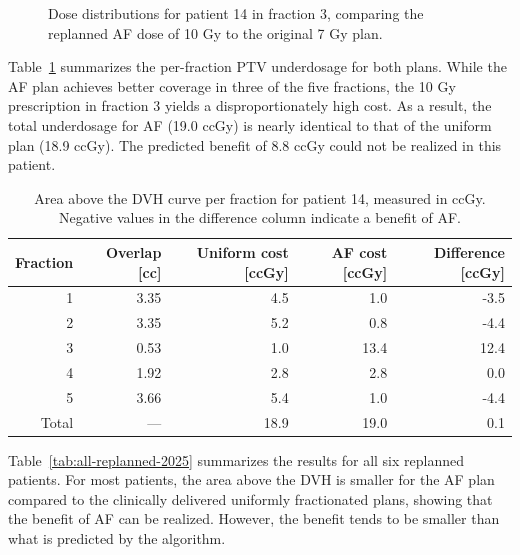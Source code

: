 \documentclass[11pt]{article}
\newcommand{\toprule}{\hline}
\newcommand{\midrule}{\hline}
\newcommand{\bottomrule}{\hline}
\begin{document}
\begin{figure}[ht]
\centering
{}
\caption{Dose distributions for patient 14 in fraction 3, comparing the replanned AF dose of 10 Gy to the original 7 Gy plan.}
\label{fig:patient14-dose-dist}
\end{figure}

Table~\ref{tab:patient14-replan} summarizes the per-fraction PTV underdosage for both plans. While the AF plan achieves better coverage in three of the five fractions, the 10 Gy prescription in fraction 3 yields a disproportionately high cost. As a result, the total underdosage for AF (19.0 ccGy) is nearly identical to that of the uniform plan (18.9 ccGy). The predicted benefit of 8.8 ccGy could not be realized in this patient.

\begin{table}[ht]
\centering
\caption{Area above the DVH curve per fraction for patient 14, measured in ccGy. Negative values in the difference column indicate a benefit of AF.}
\label{tab:patient14-replan}
\begin{tabular}{rrrrr}
\toprule
Fraction & Overlap [cc] & Uniform cost [ccGy] & AF cost [ccGy] & Difference [ccGy] \\
\midrule
1 & 3.35 & 4.5 & 1.0 & -3.5 \\
2 & 3.35 & 5.2 & 0.8 & -4.4 \\
3 & 0.53 & 1.0 & 13.4 & 12.4 \\
4 & 1.92 & 2.8 & 2.8 & 0.0 \\
5 & 3.66 & 5.4 & 1.0 & -4.4 \\
Total & --- & 18.9 & 19.0 & 0.1 \\
\bottomrule
\end{tabular}
\end{table}

Table~\ref{tab:all-replanned-2025} summarizes the results for all six replanned patients. For most patients, the area above the DVH is smaller for the AF plan compared to the clinically delivered uniformly fractionated plans, showing that the benefit of AF can be realized. However, the benefit tends to be smaller than what is predicted by the algorithm.
\end{document}
